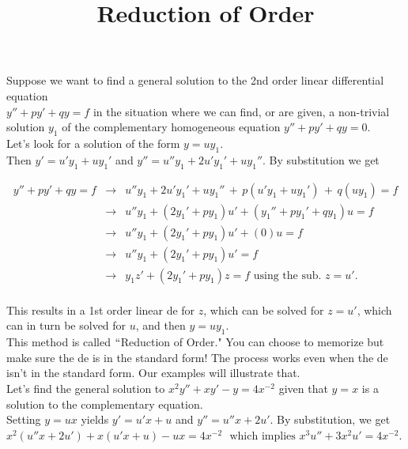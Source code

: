 \documentclass{ximera}
\begin{document}
\begin{abstract}
 \end{abstract}

    \title{Reduction of Order}
    
    \maketitle


 Suppose we want to find a general solution to the 2nd order linear differential equation \\ $y''+py'+qy=f$ in the situation where we can find, or are given, a non-trivial solution $y_{1}$ of the complementary homogeneous equation $y''+py'+qy=0$.\\

 Let's look for a solution of the form $y=uy_{1}$. \\

 Then $y'=u'y_{1}+uy_{1}'$ and $y''=u''y_{1}+2u'y_{1}'+uy_{1}''$.  By substitution we get

 \begin{eqnarray*}
  y''+py'+qy=f &\rightarrow & u''y_{1}+2u'y_{1}'+uy_{1}''\,+\,p(u'y_{1}+uy_{1}')\,+\,q(uy_{1})=f \\
   &\rightarrow & u'' y_1 +(2y_1'+py_1)u'+(y_1 ''+py_1 '+qy_1)u=f \\
   &\rightarrow & u'' y_1 +(2y_1'+py_1)u'+(0)u=f \\
   &\rightarrow & u'' y_1 +(2y_1'+py_1)u'=f \\
   &\rightarrow & y_1 z'  +(2y_1'+py_1)z=f\mbox{ using the sub. }z=u'.\\
 \end{eqnarray*}

 This results in a 1st order linear de for $z$, which can be solved for $z=u'$, which can in turn be solved for $u$, and then $y=uy_1$.\\

 This method is called $``$Reduction of Order."  You can choose to memorize  but make sure the de is in the standard form!  The process works even when the de isn't in the standard form.  Our examples will illustrate that.\\


 Let's find the general solution to $x^{2}y''+xy'-y=4x^{-2}$ given that $y=x$ is a solution to the complementary equation.\\

 Setting $y=ux$ yields $y'=u'x+u$ and $y''=u''x+2u'$.  By substitution, we get  \\$\displaystyle x^{2}(u''x+2u')+x(u'x+u)-ux=4x^{-2}$ $\mbox{ which implies }x^{3}u''+3x^{2}u'=4x^{-2}$.\\
\end{document}
